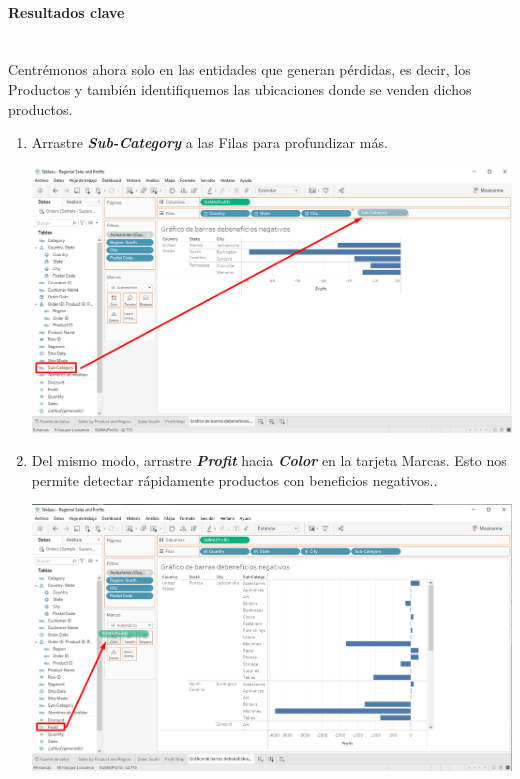 \documentclass[12pt,letterpaper]{article}
\begin{document}
    \paragraph{\large Resultados clave\\ \\}
    Centrémonos ahora solo en las entidades que generan pérdidas, es decir, los Productos y también identifiquemos las ubicaciones donde se venden dichos productos.
    \begin{enumerate}
        \item Arrastre \textit{\textbf{Sub-Category}} a las Filas para profundizar más.
        \begin{center}
            \includegraphics[width=15cm]{./img/img57.png}
        \end{center}
        \item Del mismo modo, arrastre \textit{\textbf{Profit}} hacia \textit{\textbf{Color}} en la tarjeta Marcas. Esto nos permite detectar rápidamente productos con beneficios negativos..
        \begin{center}
            \includegraphics[width=15cm]{./img/img58.png}
        \end{center}

\end{enumerate}
\end{document}
